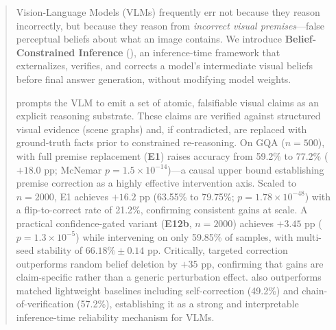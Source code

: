 \begin{abstract}
Vision-Language Models (VLMs) frequently err not because they reason incorrectly,
but because they reason from \emph{incorrect visual premises}---false perceptual
beliefs about what an image contains.
We introduce \textbf{Belief-Constrained Inference} (\bci{}), an inference-time
framework that externalizes, verifies, and corrects a model's intermediate visual
beliefs before final answer generation, without modifying model weights.

\bci{} prompts the VLM to emit a set of atomic, falsifiable visual claims as an
explicit reasoning substrate. These claims are verified against structured visual
evidence (scene graphs) and, if contradicted, are replaced with ground-truth facts
prior to constrained re-reasoning. On GQA ($n{=}500$), \bci{} with full premise
replacement (\textbf{E1}) raises accuracy from 59.2\% to 77.2\% ($+18.0$ pp;
McNemar $p{=}1.5{\times}10^{-14}$)---a causal upper bound establishing premise
correction as a highly effective intervention axis.
Scaled to $n{=}2000$, E1 achieves $+16.2$ pp (63.55\% to 79.75\%;
$p{=}1.78{\times}10^{-48}$) with a flip-to-correct rate of 21.2\%, confirming
consistent gains at scale.
A practical confidence-gated variant (\textbf{E12b}, $n{=}2000$) achieves
$+3.45$ pp ($p{=}1.3{\times}10^{-5}$) while intervening on only 59.85\% of
samples, with multi-seed stability of $66.18\%\pm 0.14$ pp.
Critically, targeted correction outperforms random belief deletion by $+35$ pp,
confirming that gains are claim-specific rather than a generic perturbation effect.
\bci{} also outperforms matched lightweight baselines including self-correction
(49.2\%) and chain-of-verification (57.2\%), establishing it as a strong and
interpretable inference-time reliability mechanism for VLMs.
\end{abstract}
